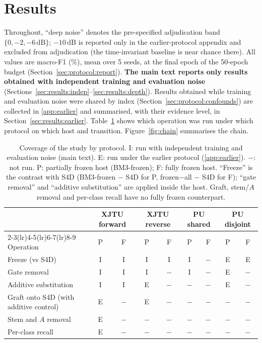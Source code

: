 \section{Results}
\label{sec:results}

Throughout, ``deep noise'' denotes the pre-specified adjudication band $\{0, -2, -6\,\mathrm{dB}\}$; $-10\,\mathrm{dB}$ is reported only in the earlier-protocol appendix and excluded from adjudication (the time-invariant baseline is near chance there). All values are macro-F1 (\%), mean over 5 seeds, at the final epoch of the 50-epoch budget (Section~\ref{sec:protocol:report}). \textbf{The main text reports only results obtained with independent training and evaluation noise} (Sections~\ref{sec:results:indep}--\ref{sec:results:depth}). Results obtained while training and evaluation noise were shared by index (Section~\ref{sec:protocol:confounds}) are collected in \ref{app:earlier} and summarised, with their evidence level, in Section~\ref{sec:results:earlier}. Table~\ref{tab:coverage} shows which operation was run under which protocol on which host and transition. Figure~\ref{fig:chain} summarises the chain.

\begin{table}[htbp]
\centering
\caption{Coverage of the study by protocol. I: run with independent training and evaluation noise (main text). E: run under the earlier protocol (\ref{app:earlier}). $-$: not run. P: partially frozen host (BM3-frozen); F: fully frozen host. ``Freeze'' is the contrast with S4D (BM3-frozen $-$ S4D for P, frozen$-$all $-$ S4D for F); ``gate removal'' and ``additive substitution'' are applied inside the host. Graft, stem/$A$ removal and per-class recall have no fully frozen counterpart.}
\label{tab:coverage}
\small\setlength{\tabcolsep}{4pt}
\begin{tabular}{@{}lcccccccc@{}}
\toprule
 & \multicolumn{2}{c}{XJTU forward} & \multicolumn{2}{c}{XJTU reverse} & \multicolumn{2}{c}{PU shared} & \multicolumn{2}{c}{PU disjoint} \\
\cmidrule(lr){2-3}\cmidrule(lr){4-5}\cmidrule(lr){6-7}\cmidrule(lr){8-9}
Operation & P & F & P & F & P & F & P & F \\
\midrule
Freeze (vs S4D) & I & I & I & I & I & $-$ & E & E \\
Gate removal & I & I & I & $-$ & I & $-$ & E & $-$ \\
Additive substitution & I & I & E & $-$ & $-$ & $-$ & E & $-$ \\
Graft onto S4D (with additive control) & E & $-$ & E & $-$ & $-$ & $-$ & $-$ & $-$ \\
Stem and $A$ removal & E & $-$ & $-$ & $-$ & $-$ & $-$ & $-$ & $-$ \\
Per-class recall & E & $-$ & $-$ & $-$ & $-$ & $-$ & $-$ & $-$ \\
\bottomrule
\end{tabular}
\end{table}

